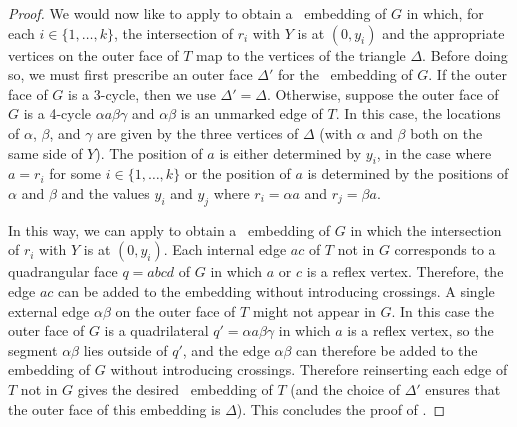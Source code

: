 \begin{proof}

        We would now like to apply  to 
	obtain a \Fary\ embedding of $G$ in which, for each $i\in\{1,\ldots,k\}$, the intersection of $r_i$
	with $Y$ is at $(0,y_i)$ and the appropriate vertices on the outer face of $T$ map to the vertices of the triangle $\Delta$.  Before doing so, we must first prescribe an outer face $\Delta'$ for the \Fary\ embedding of $G$.  If the outer face of $G$ is a 3-cycle, then we use $\Delta'=\Delta$.  Otherwise, suppose the outer face of $G$ is a 4-cycle $\alpha a\beta\gamma$ and $\alpha\beta$ is an unmarked edge of $T$.  In this case, the locations of $\alpha$, $\beta$, and $\gamma$ are given by the three vertices of $\Delta$ (with $\alpha$ and $\beta$ both on the same side of $Y$).  The position of $a$ is either determined by $y_i$, in the case where $a=r_i$ for some $i\in\{1,\ldots,k\}$ or the position of $a$ is determined by the positions of $\alpha$ and $\beta$ and the values $y_{i}$
and $y_j$ where $r_i=\alpha a$ and $r_j=\beta a$.

	In this way, we can apply  to
	obtain a \Fary\ embedding of $G$ in which the intersection of $r_i$
	with $Y$ is at $(0,y_i)$.  Each internal edge $ac$ of $T$ not in $G$
	corresponds to a quadrangular face $q=abcd$ of $G$ in which $a$ or $c$ is a
	reflex vertex.  Therefore, the edge $ac$ can be added to the embedding
	without introducing crossings.  A single external edge $\alpha\beta$
	on the outer face of $T$ might not appear in $G$. In this case the outer
	face of $G$ is a quadrilateral $q'=\alpha a \beta \gamma$ in which $a$ is
	a reflex vertex, so the segment $\alpha\beta$ lies outside of $q'$, and the edge $\alpha\beta$ can therefore be added to the embedding of $G$
	without introducing crossings. Therefore reinserting each edge of $T$ not in $G$ gives the desired \Fary\ embedding of $T$ (and the choice of $\Delta'$ ensures that the outer face of this embedding is $\Delta$). 
        This concludes the proof of .
\end{proof}
	
